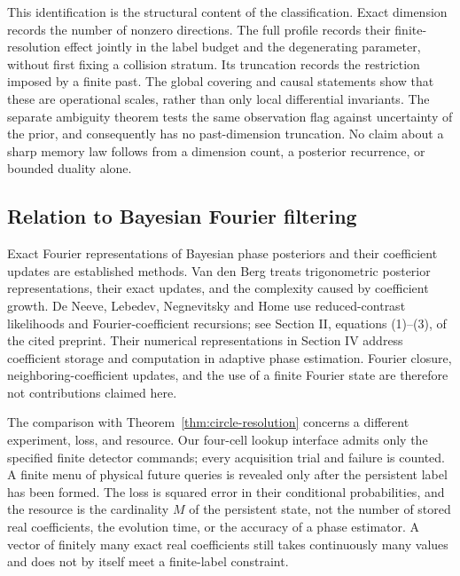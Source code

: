 This identification is the structural content of the classification.
Exact dimension records the number of nonzero directions. The full
profile records their finite-resolution effect jointly in the label
budget and the degenerating parameter, without first fixing a collision
stratum. Its truncation records the restriction imposed by a finite
past. The global covering and causal statements show that these are
operational scales, rather than only local differential invariants.
The separate ambiguity theorem tests the same observation flag against
uncertainty of the prior, and consequently has no past-dimension
truncation. No claim about a sharp memory law follows from a dimension
count, a posterior recurrence, or bounded duality alone.

\subsection{Relation to Bayesian Fourier filtering}
\label{sec:fourier-filtering-comparison}
Exact Fourier representations of Bayesian phase posteriors and their
coefficient updates are established methods. Van den Berg
\cite[Section 2.2, equations (12)--(15)]{VanDenBerg2021} treats
trigonometric posterior representations, their exact updates, and the
complexity caused by coefficient growth. De Neeve, Lebedev, Negnevitsky
and Home \cite{DeNeeveEtAl2025} use reduced-contrast likelihoods and
Fourier-coefficient recursions; see Section II, equations (1)--(3), of
the cited preprint. Their numerical representations in Section IV
address coefficient storage and computation in adaptive phase
estimation. Fourier closure, neighboring-coefficient updates, and the
use of a finite Fourier state are therefore not contributions claimed
here.

The comparison with Theorem~\ref{thm:circle-resolution} concerns a
different experiment, loss, and resource. Our four-cell lookup interface
admits only the specified finite detector commands; every acquisition
trial and failure is counted. A finite menu of physical future queries
is revealed only after the persistent label has been formed. The loss
is squared error in their conditional probabilities, and the resource
is the cardinality $M$ of the persistent state, not the number of
stored real coefficients, the evolution time, or the accuracy of a
phase estimator. A vector of finitely many exact real coefficients
still takes continuously many values and does not by itself meet a
finite-label constraint.

